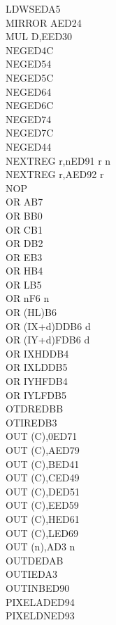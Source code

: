 \begin{multicols}{3}
{\begin{tabbing}
		LDWS\ZXN\>EDA5\\
		MIRROR A\ZXN\>ED24\\
		MUL D,E\ZXN\>ED30\\
		NEG\UNDOC\>ED4C\\
		NEG\UNDOC\>ED54\\
		NEG\UNDOC\>ED5C\\
		NEG\UNDOC\>ED64\\
		NEG\UNDOC\>ED6C\\
		NEG\UNDOC\>ED74\\
		NEG\UNDOC\>ED7C\\
		NEG\>ED44\\
		NEXTREG r,n\ZXN\>ED91 r n\\
		NEXTREG r,A\ZXN\>ED92 r\\
		NOP\\
		OR A\>B7\\
		OR B\>B0\\
		OR C\>B1\\
		OR D\>B2\\
		OR E\>B3\\
		OR H\>B4\\
		OR L\>B5\\
		OR n\>F6 n\\
		OR (HL)\>B6\\
		OR (IX+d)\>DDB6 d\\
		OR (IY+d)\>FDB6 d\\
		OR IXH\UNDOC\>DDB4\\
		OR IXL\UNDOC\>DDB5\\
		OR IYH\UNDOC\>FDB4\\
		OR IYL\UNDOC\>FDB5\\
		OTDR\>EDBB\\
		OTIR\>EDB3\\
		OUT (C),0\UNDOC\>ED71\\
		OUT (C),A\>ED79\\
		OUT (C),B\>ED41\\
		OUT (C),C\>ED49\\
		OUT (C),D\>ED51\\
		OUT (C),E\>ED59\\
		OUT (C),H\>ED61\\
		OUT (C),L\>ED69\\
		OUT (n),A\>D3 n\\
		OUTD\>EDAB\\
		OUTI\>EDA3\\
		OUTINB\ZXN\>ED90\\
		PIXELAD\ZXN\>ED94\\
		PIXELDN\ZXN\>ED93\\

\end{tabbing}}
\end{multicols}

